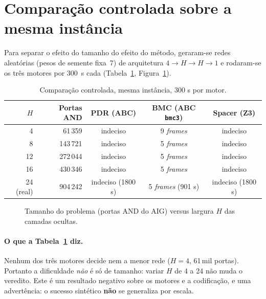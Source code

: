 \documentclass[12pt,openright,oneside,a4paper,chapter=TITLE,sumario=tradicional,english,brazil]{abntex2}
\begin{document}
\section{Comparação controlada sobre a mesma instância}

Para separar o efeito do tamanho do efeito do método, geraram-se redes aleatórias (pesos de semente fixa~7) de arquitetura $4{\to}H{\to}H{\to}1$ e rodaram-se os três motores por 300~s cada (Tabela~\ref{tab:escala}, Figura~\ref{fig:escala}).

\begin{table}[htb]
\caption{Comparação controlada, mesma instância, 300 s por motor.}\label{tab:escala}
\centering
\begin{tabular}{r|r|c|c|c}
\toprule
$H$ & Portas AND & PDR (ABC) & BMC (ABC \texttt{bmc3}) & Spacer (Z3) \\
\midrule
 4 &  61\,359 & indeciso & 9 \emph{frames} & indeciso \\
 8 & 143\,721 & indeciso & 5 \emph{frames} & indeciso \\
12 & 272\,044 & indeciso & 5 \emph{frames} & indeciso \\
16 & 430\,346 & indeciso & 5 \emph{frames} & indeciso \\
24 (real) & 904\,242 & indeciso (1800 s) & 5 \emph{frames} (901 s) & indeciso (1800 s) \\
\bottomrule
\end{tabular}
\end{table}

\begin{figure}[htb]
  \caption{Tamanho do problema (portas AND do AIG) versus largura $H$ das camadas ocultas.}\label{fig:escala}
  \centering
\end{figure}

\paragraph{O que a Tabela~\ref{tab:escala} diz.} Nenhum dos três motores decide nem a menor rede ($H{=}4$, 61\,mil portas). Portanto a dificuldade \emph{não} é só de tamanho: variar $H$ de 4 a 24 não muda o veredito. Este é um resultado negativo sobre os motores e a codificação, e uma advertência: o sucesso sintético \textbf{não} se generaliza por escala.
\end{document}
